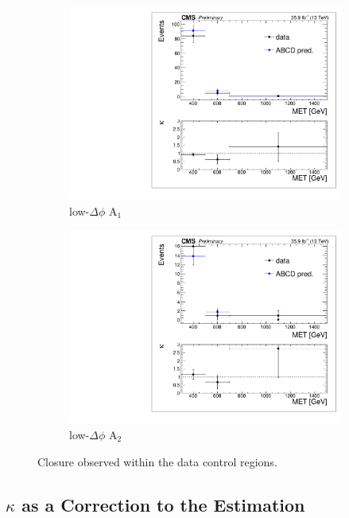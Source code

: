 \begin{figure}[hbp!]
\begin{subfigure}[b]{0.425\textwidth}
\includegraphics[trim={5px 5px 5px 5px},clip,width=\textwidth]{figs/SUS17006/dataClosure_single-tagSR_lowDphi.pdf} 
\caption{low-$\Delta\phi$ A$_{1}$}
\end{subfigure}
\begin{subfigure}[b]{0.425\textwidth}
\centering
\includegraphics[trim={5px 5px 5px 5px},clip,width=\textwidth]{figs/SUS17006/dataClosure_double-tagSR_lowDphi.pdf} 
\caption{low-$\Delta\phi$ A$_{2}$}
\end{subfigure}
\caption{Closure observed within the data control regions.}
\label{fig:closure}
\end{figure}

\subsection{$\kappa$ as a Correction to the Estimation}
\label{sec:kappa}

